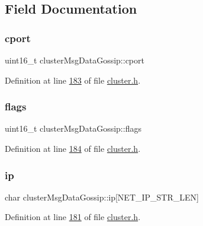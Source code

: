 \subsection{Field Documentation}
\mbox{\label{structclusterMsgDataGossip_a2e1abb299507da7c3f6b56235a9ad1f5}} 
\subsubsection{\texorpdfstring{cport}{cport}}
{\footnotesize\ttfamily uint16\+\_\+t cluster\+Msg\+Data\+Gossip\+::cport}



Definition at line \hyperlink{cluster_8h_source_l00183}{183} of file \hyperlink{cluster_8h_source}{cluster.\+h}.

\mbox{\label{structclusterMsgDataGossip_ad1ca60d86c831ae3592f10f1632c71e1}} 
\subsubsection{\texorpdfstring{flags}{flags}}
{\footnotesize\ttfamily uint16\+\_\+t cluster\+Msg\+Data\+Gossip\+::flags}



Definition at line \hyperlink{cluster_8h_source_l00184}{184} of file \hyperlink{cluster_8h_source}{cluster.\+h}.

\mbox{\label{structclusterMsgDataGossip_ad1f61e0cc5f9be1db6aa4cd7c85c554a}} 
\subsubsection{\texorpdfstring{ip}{ip}}
{\footnotesize\ttfamily char cluster\+Msg\+Data\+Gossip\+::ip\mbox{[}N\+E\+T\+\_\+\+I\+P\+\_\+\+S\+T\+R\+\_\+\+L\+EN\mbox{]}}



Definition at line \hyperlink{cluster_8h_source_l00181}{181} of file \hyperlink{cluster_8h_source}{cluster.\+h}.

